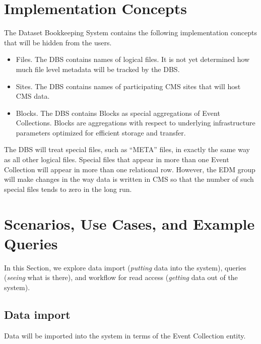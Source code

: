 \documentclass{cmspaper}
\begin{document}
\section{Implementation Concepts}

The Dataset Bookkeeping System contains the following implementation concepts 
that will be hidden from the users.  

\begin{itemize}
\item Files.  The DBS contains names of logical files.  It is not yet
determined how much file level metadata will be tracked by the DBS. 
\item Sites.  The DBS contains names of participating CMS sites that 
will host CMS data.  
\item Blocks.  The DBS contains Blocks as special aggregations of Event 
Collections. Blocks are aggregations with respect to underlying 
infrastructure parameters optimized for efficient storage and transfer.  
\end{itemize}

The DBS will treat special files, such as ``META'' files, in 
exactly the same way as all other logical files.  Special files that 
appear in more than one Event Collection will appear in more than one
relational row.  However, the EDM group will 
make changes in the way data is written in CMS so that the number of 
such special files tends to zero in the long run.  


\section{Scenarios, Use Cases, and Example Queries}

In this Section, we explore data import
({\em putting} data into the system), queries ({\em seeing} what is there),
and workflow for read access ({\em getting} data out of the system).

\subsection{Data import}

Data will be imported into the system in terms of the 
Event Collection entity.  

\end{document}

